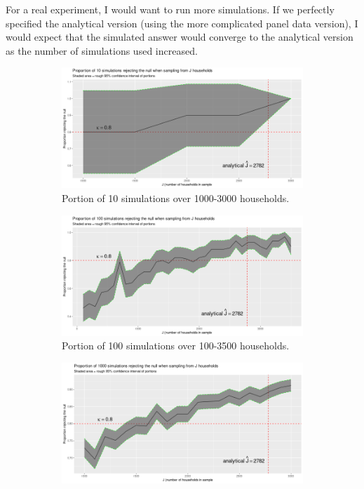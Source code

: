 \documentclass[12pt]{article}
\begin{document}
For a real experiment, I would want to run more simulations. If we perfectly specified the analytical version (using the more complicated panel data version), I would expect that the simulated answer would converge to the analytical version as the number of simulations used increased.

\def\widthfrac{0.7}
\begin{figure}[h!]
\centering
\begin{subfigure}{\widthfrac\textwidth}
    \centering
    \includegraphics[width=\textwidth]{"1-2_simulations_10_1000-to-3000"}
    \caption{Portion of 10 simulations over 1000-3000 households.}
    \label{fig1-2a}
  \end{subfigure}
\begin{subfigure}{\widthfrac\textwidth}
    \centering
    \includegraphics[width=\textwidth]{"1-2_simulations_100_100-to-3500"}
    \caption{Portion of 100 simulations over 100-3500 households.}
    \label{fig1-2b}
  \end{subfigure}
\begin{subfigure}{\widthfrac\textwidth}
    \centering
    \includegraphics[width=\textwidth]{"1-2_simulations_1000_1000-to-3000"}

\end{subfigure}
\end{figure}
\end{document}
